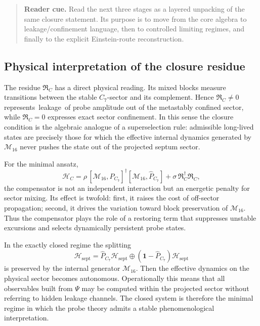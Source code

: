 \begin{quote}\small
\noindent\textbf{Reader cue.} Read the next three stages as a layered unpacking of the same closure statement. Its purpose is to move from the core algebra to leakage/confinement language, then to controlled limiting regimes, and finally to the explicit Einstein-route reconstruction.
\end{quote}

\subsection*{Physical interpretation of the closure residue}

\begin{remark}
The residue $\mathfrak R_C$ has a direct physical reading.
Its mixed blocks measure transitions between the stable $C_7$-sector and
its complement.
Hence $\mathfrak R_C\neq 0$ represents \,leakage\, of probe amplitude out
of the metastably confined sector, while $\mathfrak R_C=0$ expresses exact
sector confinement.
In this sense the closure condition is the algebraic analogue of a
superselection rule: admissible long-lived states are precisely those for
which the effective internal dynamics generated by $\mathcal M_{16}$ never
pushes the state out of the projected septum sector.
\end{remark}

\begin{remark}
For the minimal ansatz,
\[
  \mathcal H_C
  = \rho\,[\mathcal M_{16},\hat P_{C_7}]^\dagger[\mathcal M_{16},\hat P_{C_7}]
    + \sigma\,\mathfrak R_C^\dagger\mathfrak R_C,
\]
the compensator is not an independent interaction but an energetic penalty
for sector mixing.
Its effect is twofold:
first, it raises the cost of off-sector propagation; second, it drives the
variation toward block preservation of $\mathcal M_{16}$.
Thus the compensator plays the role of a restoring term that suppresses
unstable excursions and selects dynamically persistent probe states.
\end{remark}

\begin{remark}
In the exactly closed regime the splitting
\[
  \mathcal H_{\mathrm{sept}}
  = \hat P_{C_7}\mathcal H_{\mathrm{sept}}
  \oplus
  (\mathbf 1-\hat P_{C_7})\mathcal H_{\mathrm{sept}}
\]
is preserved by the internal generator $\mathcal M_{16}$.
Then the effective dynamics on the physical sector becomes autonomous.
Operationally this means that all observables built from $\Psi$ may be
computed within the projected sector without referring to hidden leakage
channels.
The closed system is therefore the minimal regime in which the probe theory
admits a stable phenomenological interpretation.
\end{remark}

